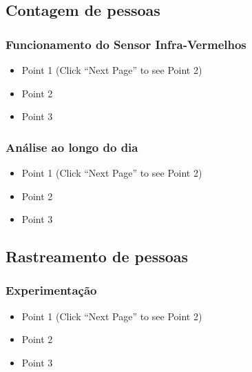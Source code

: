 \documentclass[]{beamer}
\begin{document}
\subsection{Contagem de pessoas}

\begin{frame}
  \frametitle{Funcionamento do Sensor Infra-Vermelhos}   %

  \begin{itemize}
  \item<1-> Point 1 (Click ``Next Page'' to see Point 2) %
  \item<2-> Point 2  %
  \item<3-> Point 3
  \end{itemize}
\end{frame}

\begin{frame}
  \frametitle{Análise ao longo do dia}   %

  \begin{itemize}
  \item<1-> Point 1 (Click ``Next Page'' to see Point 2) %
  \item<2-> Point 2  %
  \item<3-> Point 3
  \end{itemize}
\end{frame}

\subsection{Rastreamento de pessoas}

\begin{frame}
  \frametitle{Experimentação}   %

  \begin{itemize}
  \item<1-> Point 1 (Click ``Next Page'' to see Point 2) %
  \item<2-> Point 2  %
  \item<3-> Point 3
  \end{itemize}
\end{frame}
\end{document}

